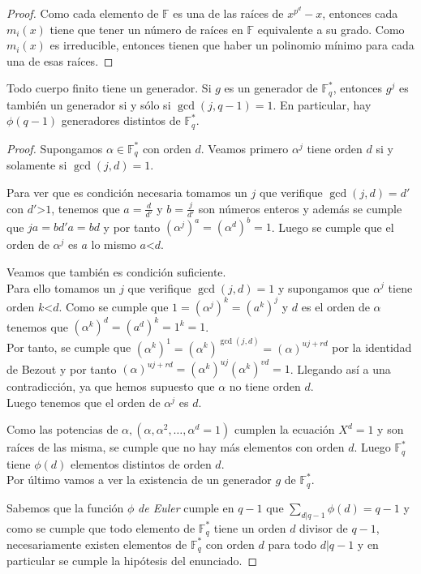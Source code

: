 \begin{proof}
		Como cada elemento de $\mathbb{F}$ es una de las raíces de $x^{p^d}-x$, entonces cada $m_i(x)$ tiene que tener un número de raíces en $\mathbb{F}$ equivalente a su grado. Como $m_i(x)$ es irreducible, entonces tienen que haber un polinomio mínimo para cada una de esas raíces.
\end{proof}

\begin{teorema}
	Todo cuerpo finito tiene un generador. Si $g$ es un generador de $\mathbb{F}^{*}_q$, entonces $g^j$ es también un generador si y sólo si $\operatorname{gcd}(j,q-1)=1$. En particular, hay $\phi(q-1)$ generadores distintos de $\mathbb{F}^*_q$.
\end{teorema}
\begin{proof}
		Supongamos $\alpha \in \mathbb{F}^*_q$ con orden $d$. Veamos primero $\alpha^j$ tiene orden $d$ si y solamente si $\operatorname{gcd}(j,d)=1$.

		Para ver que es condición necesaria tomamos un $j$ que verifique $\operatorname{gcd}(j, d)=d'$ con $d'$\textgreater$ 1$, tenemos que $a=\frac{d}{d'}$ y $b=\frac{j}{d'}$ son números enteros y además se cumple que $ja=bd'a=bd$ y por tanto $(\alpha^j)^a=(\alpha^d)^b=1$. Luego se cumple que el orden de $\alpha^j$ es $a$ lo mismo $a$\textless $d$.

		Veamos que también es condición suficiente.\\ Para ello tomamos un $j$ que verifique $\operatorname{gcd}(j,d)=1$ y supongamos que $\alpha^j$ tiene orden $k$\textless $d$. Como se cumple que $1=(\alpha^j)^k=(a^k)^j$ y $d$ es el orden de $\alpha$ tenemos que $(\alpha^k)^d=(a^d)^k=1^k=1$.\\
		Por tanto, se cumple que  $(\alpha^k)^1=(\alpha^k)^{\operatorname{gcd}(j,d)}=(\alpha)^{uj+rd}$ por la identidad de Bezout y por tanto $(\alpha)^{uj+rd}=(\alpha^k)^{uj}(\alpha^k)^{vd}=1$. Llegando así a una contradicción, ya que hemos supuesto que $\alpha$ no tiene orden $d$.\\
		Luego tenemos que el orden de $\alpha^j$ es $d$.

		Como las potencias de $\alpha,(\alpha,\alpha^2,\dots,\alpha^d=1)$ cumplen la ecuación $X^d=1$ y son raíces de las misma, se cumple que no hay más elementos con orden $d$. Luego $\mathbb{F}^*_q$ tiene $\phi(d)$ elementos distintos de orden $d$.\\
		Por último vamos a ver la existencia de un generador $g$ de $\mathbb{F}_q^*$.

		Sabemos que la función $\phi$ \emph{de Euler} cumple en $q-1$ que $\sum_{d|q-1}\phi(d)=q-1$ y como se cumple que todo elemento de $\mathbb{F}^*_q$ tiene un orden $d$ divisor de $q-1$, necesariamente existen elementos de $\mathbb{F}^*_q$ con orden $d$ para todo $d|q-1$ y en particular se cumple la hipótesis del enunciado.
\end{proof}

